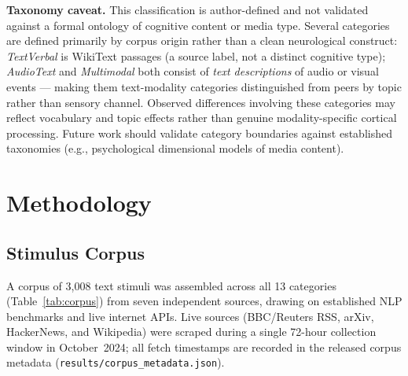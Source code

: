 \documentclass[11pt,letterpaper]{article}
\numberwithin{equation}{section}
\begin{document}
\noindent\textbf{Taxonomy caveat.} This classification is author-defined and not validated against a formal ontology of cognitive content or media type. Several categories are defined primarily by corpus origin rather than a clean neurological construct: \textit{TextVerbal} is WikiText passages (a source label, not a distinct cognitive type); \textit{AudioText} and \textit{Multimodal} both consist of \textit{text descriptions} of audio or visual events --- making them text-modality categories distinguished from peers by topic rather than sensory channel. Observed differences involving these categories may reflect vocabulary and topic effects rather than genuine modality-specific cortical processing. Future work should validate category boundaries against established taxonomies (e.g., psychological dimensional models of media content).

\FloatBarrier
\clearpage
\section{Methodology}

\subsection{Stimulus Corpus}

A corpus of 3{,}008 text stimuli was assembled across all 13 categories (Table~\ref{tab:corpus}) from seven independent sources, drawing on established NLP benchmarks and live internet APIs. Live sources (BBC/Reuters RSS, arXiv, HackerNews, and Wikipedia) were scraped during a single 72-hour collection window in October~2024; all fetch timestamps are recorded in the released corpus metadata (\texttt{results/\allowbreak corpus\_metadata.json}).
\end{document}
